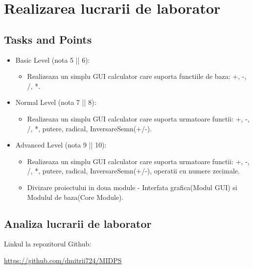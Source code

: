 \section{Realizarea lucrarii de laborator}

\subsection{Tasks and Points}
\begin{itemize}
	\item Basic Level (nota 5 || 6):
	
	\begin{itemize}
		\item Realizeaza un simplu GUI calculator care suporta functiile de baza: +, -, /, *.
	\end{itemize}
	
	\item Normal Level (nota 7 || 8):
	
	\begin{itemize}
		\item Realizeaza un simplu GUI calculator care suporta urmatoare functii: +, -, /, *, putere, radical, InversareSemn(+/-).
	\end{itemize}
	\item Advanced Level (nota 9 || 10):
	
	\begin{itemize}
		\item Realizeaza un simplu GUI calculator care suporta urmatoare functii: +, -, /, *, putere, radical, InversareSemn(+/-), operatii cu numere zecimale.
	\end{itemize}
	\begin{itemize}
		\item Divizare proiectului in doua module - Interfata grafica(Modul GUI) si Modulul de baza(Core Module).
	\end{itemize}
\end{itemize}
\subsection{Analiza lucrarii de laborator}

Linkul la repozitorul Github:\\
\begin{center}
\url{https://github.com/dmitrii724/MIDPS}
\end{center}

